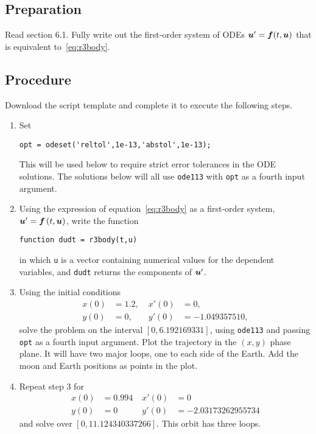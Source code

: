 \documentclass[11pt,twoside]{article}
\begin{document}
\subsection*{Preparation}

Read section 6.1. Fully write out the first-order system of ODEs $\bm{u}'=\bm{f}(t,\bm{u})$ that is equivalent to~\eqref{eq:r3body}. 

\subsection*{Procedure}

Download the script template and complete it to execute the following steps. 

\begin{enumerate}
\item Set
\begin{verbatim}
opt = odeset('reltol',1e-13,'abstol',1e-13);
\end{verbatim}
This will be used below to require strict error tolerances in the ODE solutions. The solutions below will all use \texttt{ode113} with \texttt{opt} as a fourth input argument.

\item Using the expression of equation~\eqref{eq:r3body} as a first-order system, $\bm{u}'=\bm{f}\,(t,\bm{u})$, write the function
\begin{verbatim}
function dudt = r3body(t,u)
\end{verbatim}
in which \texttt{u} is a vector containing numerical values for the dependent variables, and \texttt{dudt} returns the components of $\bm{u}'$. 

\item Using the initial conditions 
  \begin{align*}
    x(0) &= 1.2, \; & x'(0) &= 0, \\
    y(0) &= 0, \; & y'(0) &= -1.049357510,
  \end{align*}
solve the problem on the interval $[0,6.192169331]$, using \texttt{ode113} and passing \texttt{opt} as a fourth input argument. Plot the trajectory in the $(x,y)$ phase plane. It will have two major loops, one to each side of the Earth. Add the moon and Earth positions as points in the plot.  

\item Repeat step 3 for
  \begin{align*}
    x(0) &= 0.994 \; & x'(0) &= 0 \\
    y(0) &= 0 \; & y'(0) &= -2.03173262955734
  \end{align*}
  and solve over $[0,11.124340337266]$. This orbit has three loops.


\end{enumerate}
\end{document}
